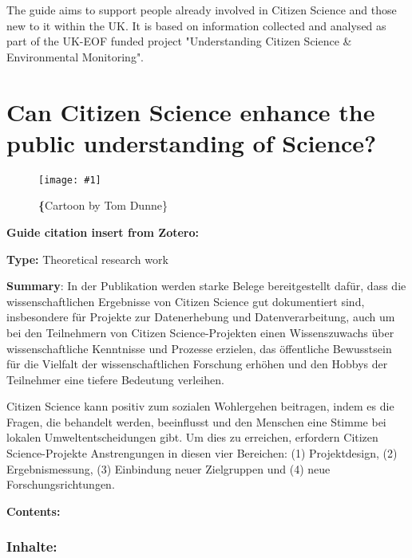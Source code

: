 \documentclass{article}
\newlength{\imgwidth}
\newcommand\scaledgraphics[2]{%
                
\settowidth{\imgwidth}{\texttt{[image: \#1]}}%
                
\setlength{\imgwidth}{\minof{\imgwidth}{#2\textwidth}}%
                
\texttt{[image: \#1]}%
                
}
\begin{document}
The guide aims to support people already involved in Citizen Science and those new to it within the UK. It is based on information collected and analysed as part of the UK-EOF funded project "Understanding Citizen Science \& Environmental Monitoring".


\section{Can Citizen Science enhance the public understanding of Science?}\label{H2333653}



\begin{center}
\begin{figure}
\scaledgraphics{fb9872a4-8371-4bfe-a930-f1d621c5649e.png}{0.5}
\caption*{\textbf\{Cartoon by Tom Dunne\}}\label{F26530171}
\end{figure}


\end{center}





\textbf{Guide citation insert from Zotero:} \autocite{bonney_can_2015}


\textbf{Type: }Theoretical research work


\textbf{Summary}: In der Publikation werden starke Belege bereitgestellt dafür, dass die wissenschaftlichen Ergebnisse von Citizen Science gut dokumentiert sind, insbesondere für Projekte zur Datenerhebung und Datenverarbeitung, auch um bei den Teilnehmern von Citizen Science-Projekten einen Wissenszuwachs über wissenschaftliche Kenntnisse und Prozesse erzielen, das öffentliche Bewusstsein für die Vielfalt der wissenschaftlichen Forschung erhöhen und den Hobbys der Teilnehmer eine tiefere Bedeutung verleihen. 


Citizen Science kann positiv zum sozialen Wohlergehen beitragen, indem es die Fragen, die behandelt werden, beeinflusst und den Menschen eine Stimme bei lokalen Umweltentscheidungen gibt. Um dies zu erreichen, erfordern Citizen Science-Projekte Anstrengungen in diesen vier Bereichen: (1) Projektdesign, (2) Ergebnismessung, (3) Einbindung neuer Zielgruppen und (4) neue Forschungsrichtungen.


\textbf{Contents:}


\subsubsection{Inhalte: }\label{H3778084}
\end{document}
